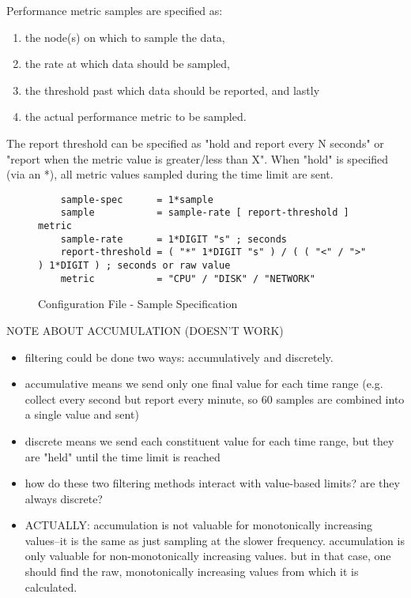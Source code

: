 Performance metric samples are specified as:

\begin{enumerate}
\item the node(s) on which to sample the data,
\item the rate at which data should be sampled,
\item the threshold past which data should be reported, and lastly
\item the actual performance metric to be sampled.
\end{enumerate}

The report threshold can be specified as "hold and report every N seconds" or "report when the metric value is
greater/less than X". When "hold" is specified (via an *), all metric values sampled during the time limit are sent.

\begin{figure}[ht]
    \begin{lstlisting}
    sample-spec      = 1*sample
    sample           = sample-rate [ report-threshold ] metric
    sample-rate      = 1*DIGIT "s" ; seconds
    report-threshold = ( "*" 1*DIGIT "s" ) / ( ( "<" / ">" ) 1*DIGIT ) ; seconds or raw value
    metric           = "CPU" / "DISK" / "NETWORK"
    \end{lstlisting}
    \caption{Configuration File - Sample Specification}
    \label{fig:config_file_sample}
\end{figure}

NOTE ABOUT ACCUMULATION (DOESN'T WORK)

\begin{itemize}
\item filtering could be done two ways: accumulatively and discretely.
\item accumulative means we send only one final value for each time range (e.g. collect every second but report every
      minute, so 60 samples are combined into a single value and sent)
\item discrete means we send each constituent value for each time range, but they are "held" until the time limit is
      reached
\item how do these two filtering methods interact with value-based limits? are they always discrete?
\item ACTUALLY: accumulation is not valuable for monotonically increasing values--it is the same as just sampling at the
      slower frequency. accumulation is only valuable for non-monotonically increasing values. but in that case, one
      should find the raw, monotonically increasing values from which it is calculated.
\end{itemize}

